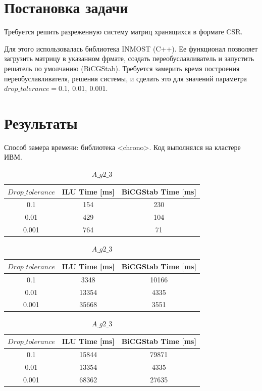 


	\tableofcontents
	
	\section{Постановка задачи}
	
	 Требуется решить разреженную систему матриц хранящихся в формате CSR.
	 
	  Для этого использовалась библиотека INMOST (C++). Ее функционал позволяет загрузить матрицу в указанном фрмате, создать переобуславливатель и запустить решатель по умолчанию (BiCGStab).
Требуется замерить время построения переобуславливателя, решения системы, и сделать это для значений параметра $drop\_tolerance = 0.1,~0.01,~0.001$.

	\section{Результаты}
	
	Способ замера времени: библиотека <chrono>. Код выполнялся на кластере ИВМ.

\begin{table}[h!]
	\centering
	\begin{tabular}{|c|c|c|}
		\hline
		$Drop\_tolerance$  & ILU Time [ms] & BiCGStab Time [ms]\\ \hline
		0.1 & 154 &  230 \\ 
		\hline
		0.01 & 429 & 104 \\
		\hline
		0.001 & 764 & 71\\
		\hline
	\end{tabular}
	\caption{$A\_g2\_1$}
	\label{table:1}
\medskip
	\centering
	\begin{tabular}{|c|c|c|}
		\hline
		$Drop\_tolerance$  & ILU Time [ms] & BiCGStab Time [ms]\\ \hline
		0.1 & 3348 & 10166 \\ 
		\hline
		0.01 & 13354 & 4335 \\
		\hline
		0.001 & 35668 & 3551\\
		\hline
	\end{tabular}
	\caption{$A\_g2\_2$}
	\label{table:1}
\medskip
	\centering
	\begin{tabular}{|c|c|c|}
		\hline
		$Drop\_tolerance$  & ILU Time [ms] & BiCGStab Time [ms]\\ \hline
		0.1 & 15844 & 79871 \\ 
		\hline
		0.01 & 13354 & 4335 \\
		\hline
		0.001 & 68362 & 27635\\
		\hline
	\end{tabular}
	\caption{$A\_g2\_3$}
	\label{table:1}
\end{table}

